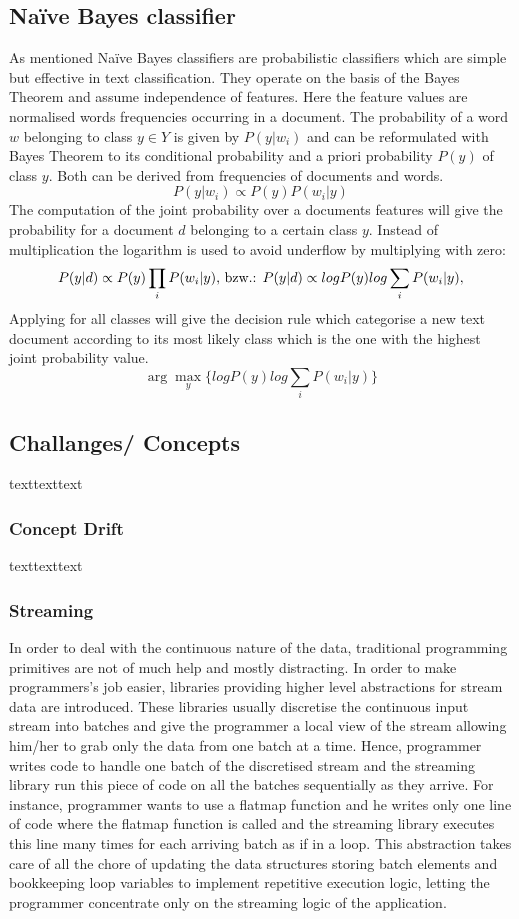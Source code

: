 \documentclass[12pt]{article}
\begin{document}
\subsection{Na\"ive Bayes classifier}

As mentioned Na\"ive Bayes classifiers are probabilistic classifiers which are simple but effective in text classification. They operate on the basis of the Bayes Theorem and assume independence of features. Here the feature values are normalised  words frequencies occurring in a document. The probability of a word $w$ belonging to class $y \in Y$ is given by $P(y|w_i)$ and can be reformulated with Bayes Theorem to its conditional probability and a priori probability $ P(y)$ of class $y$. Both can be derived from frequencies of documents and words.
$$
P(y|w_i) \propto P(y)P(w_i|y)
$$
The computation of the joint probability over a documents features will give the probability for a  document $d$ belonging to a certain class $y$. Instead of multiplication the logarithm is used to avoid underflow by multiplying with zero:
$$
P(y|d) \propto P(y)\prod_i P(w_i|y)\space
\textrm{,  bzw.:    }
P(y|d) \propto log P(y) log \sum_i P(w_i|y),
$$
Applying for all classes will give the decision rule which categorise a new text document according to its most likely class which is the one with the highest joint probability value.
$$
\arg\max_y\{ log P(y) log \sum_i P(w_i|y)\}
$$

\subsection{Challanges/ Concepts}
texttexttext

\subsubsection{Concept Drift}
texttexttext

\subsubsection{Streaming}
In order to deal with the continuous nature of the data, traditional programming primitives are not of much help and mostly distracting. In order to make programmers’s job easier, libraries providing higher level abstractions for stream data are introduced. These libraries usually discretise the continuous input stream into batches and give the programmer a local view of the stream allowing him/her to grab only the data from one batch at a time. Hence, programmer writes code to handle one batch of the discretised stream and the streaming library run this piece of code on all the batches sequentially as they arrive. For instance, programmer wants to use a flatmap function and he writes only one line of code where the flatmap function is called and the streaming library executes this line many times for each arriving batch as if in a loop. This abstraction takes care of all the chore of updating the data structures storing batch elements and bookkeeping loop variables to implement repetitive execution logic, letting the programmer concentrate only on the streaming logic of the application. 
\end{document}
